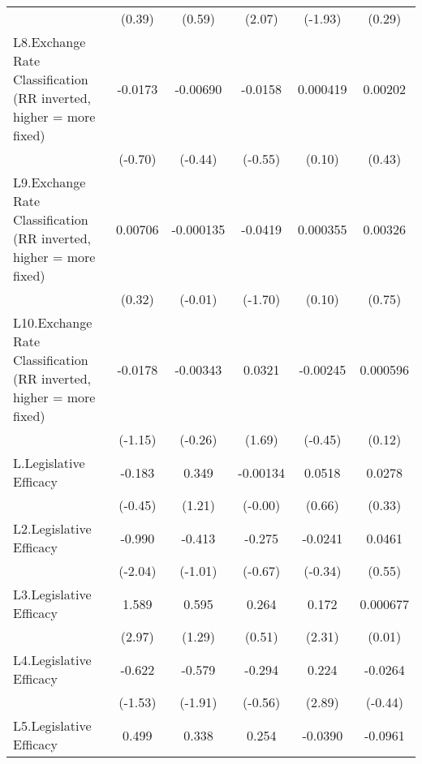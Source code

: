 {\begin{longtable}{l*{5}{c}}
                &   (0.39)         &   (0.59)         &   (2.07)         &  (-1.93)         &   (0.29)         \\
[1em]
L8.Exchange Rate Classification (RR inverted, higher = more fixed)&  -0.0173         & -0.00690         &  -0.0158         & 0.000419         &  0.00202         \\
                &  (-0.70)         &  (-0.44)         &  (-0.55)         &   (0.10)         &   (0.43)         \\
[1em]
L9.Exchange Rate Classification (RR inverted, higher = more fixed)&  0.00706         &-0.000135         &  -0.0419         & 0.000355         &  0.00326         \\
                &   (0.32)         &  (-0.01)         &  (-1.70)         &   (0.10)         &   (0.75)         \\
[1em]
L10.Exchange Rate Classification (RR inverted, higher = more fixed)&  -0.0178         & -0.00343         &   0.0321         & -0.00245         & 0.000596         \\
                &  (-1.15)         &  (-0.26)         &   (1.69)         &  (-0.45)         &   (0.12)         \\
[1em]
L.Legislative Efficacy&   -0.183         &    0.349         & -0.00134         &   0.0518         &   0.0278         \\
                &  (-0.45)         &   (1.21)         &  (-0.00)         &   (0.66)         &   (0.33)         \\
[1em]
L2.Legislative Efficacy&   -0.990\sym{*}  &   -0.413         &   -0.275         &  -0.0241         &   0.0461         \\
                &  (-2.04)         &  (-1.01)         &  (-0.67)         &  (-0.34)         &   (0.55)         \\
[1em]
L3.Legislative Efficacy&    1.589\sym{**} &    0.595         &    0.264         &    0.172\sym{*}  & 0.000677         \\
                &   (2.97)         &   (1.29)         &   (0.51)         &   (2.31)         &   (0.01)         \\
[1em]
L4.Legislative Efficacy&   -0.622         &   -0.579         &   -0.294         &    0.224\sym{**} &  -0.0264         \\
                &  (-1.53)         &  (-1.91)         &  (-0.56)         &   (2.89)         &  (-0.44)         \\
[1em]
L5.Legislative Efficacy&    0.499         &    0.338         &    0.254         &  -0.0390         &  -0.0961         \\

\end{longtable}}
